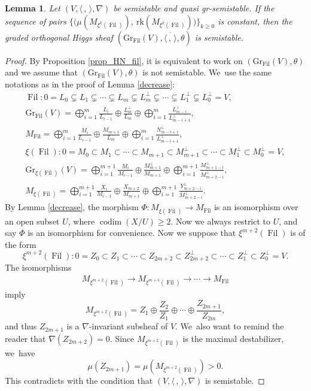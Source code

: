\documentclass[11pt]{article}
\numberwithin{equation}{section}
\newcommand{\grsemistable}{gr\nobreakdash-semi\-stable\xspace}
\DeclareMathOperator{\codim}{codim}
\DeclareMathOperator{\Filt}{Fil}
\newcommand{\rk}{\mathrm{rk}}
\newcommand{\Gr}{\mathrm{Gr}}
\theoremstyle{plain}
\newtheorem{lem}[thm]{Lemma}
\theoremstyle{definition}
\begin{document}
\begin{lem}\label{lem_const}
Let $(V, \langle \,, \, \rangle, \nabla)$ be semistable and quasi \grsemistable. If the sequence of pairs $\{\big(\mu(M_{\xi^k(\Filt)}),\ \rk(M_{\xi^k(\Filt)})\big)\}_{k\geq 0}$ is constant, then the graded orthogonal Higgs sheaf $(\Gr_{\Filt}(V), \overline{\langle \,, \, \rangle}, \theta)$ is semistable.
\end{lem}

\begin{proof}
By Proposition \ref{prop_HN_fil}, it is equivalent to work on $(\Gr_{\Filt}(V), \theta)$ and we assume that $(\Gr_{\Filt}(V), \theta)$ is not semistable. We~use the same notations as in the proof of Lemma \ref{decrease}:
\begin{gather*}
\Filt: 0= L_0 \subsetneq L_1 \subsetneq \cdots \subsetneq L_m \subsetneq L_m^\perp\subsetneq\cdots \subsetneq L_1^\perp\subsetneq L_0^\perp= V,
\\
\Gr_{\Filt}(V)=\mathop{\bigoplus}_{i=1}^{m} \frac{L_i}{L_{i-1}}\oplus \frac{L_m^\perp}{L_m}\oplus \mathop{\bigoplus}_{i=1}^{m} \frac{L_{m-i}^\perp}{L_{m-i+1}^\perp},
\\
M_{\Filt}=\mathop{\bigoplus}_{i=1}^{m} \frac{M_i}{L_{i-1}}\oplus \frac{M_{m+1}}{L_m}\oplus \mathop{\bigoplus}_{i=1}^{m} \frac{N_{m-i+1}^\perp}{L_{m-i+1}^\perp},
\\
\xi(\Filt):0=M_0\subset M_1\subset\cdots\subset M_{m+1}\subset M_{m+1}^\perp\subset\cdots\subset M_1^\perp\subset M_0^\perp=V,
\\
\Gr_{\xi(\Filt)}(V)=\mathop{\bigoplus}_{i=1}^{m+1} \frac{M_i}{M_{i-1}}\oplus \frac{M_{m+1}^\perp}{M_{m+1}}\oplus \mathop{\bigoplus}_{i=1}^{m+1} \frac{M_{m+1-i}^\perp}{M_{m+2-i}^\perp},
\\
M_{\xi(\Filt)}=\mathop{\bigoplus}_{i=1}^{m+1} \frac{X_i}{M_{i-1}}\oplus \frac{X_{m+2}}{M_{m+1}}\oplus \mathop{\bigoplus}_{i=1}^{m+1} \frac{Y_{m+2-i}^\perp}{M_{m+2-i}^\perp}.
\end{gather*}
By Lemma \ref{decrease}, the morphism $\Phi:M_{\xi(\Filt)}\to M_{\Filt}$ is an isomorphism over an open subset $U$, where $\codim(X/U) \geq 2$. Now we always restrict to $U$, and say $\Phi$ is an isomorphism for convenience. Now we suppose that $\xi^{m+2}(\Filt)$ is of the form
\[
\xi^{m+2}(\Filt): 0= Z_0 \subset Z_1 \subset \cdots \subset Z_{2m+2}\subset Z_{2m+2}^\perp\subset\cdots \subset Z_1^\perp\subset Z_0^\perp= V.
\]
The isomorphisms
\begin{align*}
M_{\xi^{m+2}(\Filt)} \to M_{\xi^{m+1}(\Filt)} \to \cdots \to M_{\Filt}
\end{align*}
imply
\[
M_{\xi^{m+2}(\Filt)}=Z_1\oplus \frac{Z_2}{Z_1}\oplus\cdots\oplus \frac{Z_{2m+1}}{Z_{2m}},
\]
and thus $Z_{2m+1}$ is a $\nabla$-invariant subsheaf of $V$. We~also want to remind the reader that $\nabla(Z_{2m+2}) = 0$. Since $M_{\xi^{m+2}(\Filt)}$ is the maximal destabilizer, we~have
\[
\mu(Z_{2m+1})=\mu(M_{\xi^{m+2}(\Filt)})>0.
\]
This contradicts with the condition that $(V,\langle \,, \, \rangle,\nabla)$ is semistable.
\end{proof}
\end{document}
